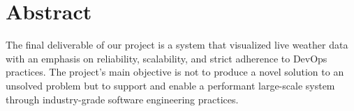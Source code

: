 \section{Abstract}
The final deliverable of our project is a system that visualized live weather data with an emphasis on reliability, scalability, and strict adherence to DevOps practices. 
The project's main objective is not to produce a novel solution to an unsolved problem but to support and enable a performant large-scale system through industry-grade software engineering practices.
